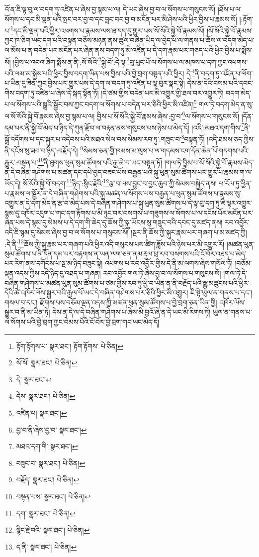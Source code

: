 འོ་ན་ཇི་ལྟ་བུ་ལ་བདག་ཏུ་འཛིན་པ་ཞེས་བྱ་སྙམ་པ་ལ། དེ་ཡང་ཞེས་བྱ་བ་ལ་སོགས་པ་གསུངས་སོ། །ཐོས་པ་ལ་སོགས་པ་དང་མི་ལྡན་པའི་སྤང་བར་བྱ་བ་དང་བླང་བར་བྱ་བ་མངོན་པར་མི་ཤེས་པའི་ཕྱིར་བྱིས་པ་རྣམས་སོ། །:རྟོག་པ་\footnote{རྟོག་རྟོགས་པ་  སྣར་ཐང་། རྟོག་རྟོགས་  པེ་ཅིན། }དང་མི་ལྡན་པའི་ཕྱིར་འཕགས་པ་རྣམས་ལས་ཐ་དད་དུ་གྱུར་པས་སོ་སོའི་སྐྱེ་བོ་རྣམས་སོ། །སོ་སོའི་སྐྱེ་བོ་རྣམས་ཀྱང་ཁ་ཅིག་ཡང་དག་པའི་བསྟན་བཅོས་མཉན་ནས་ཚུལ་བཞིན་ཡིད་ལ་བྱེད་པ་ལ་གནས་པ་ཆོས་ལ་བདག་མེད་པ་ལ་མོས་པ་ན་བདེན་པར་མངོན་པར་ཞེན་ནས་བདག་ཏུ་མི་འཛིན་པ་དེ་དག་རྣམ་པར་གཅད་པའི་ཕྱིར་བྱིས་པ་སྨོས་སོ། །བྱིས་པ་འབའ་ཞིག་སྨོས་ན་ནི་:སོ་སོའི་\footnote{སོ་སོ་  སྣར་ཐང་།  པེ་ཅིན། }སྐྱེ་བོ་:དེ་ལྟ་\footnote{དེ་  སྣར་ཐང་། }བུ་ཕུང་པོ་ལ་སོགས་པ་ལ་མཁས་པ་དག་ཀྱང་འཕགས་པའི་ལམ་མ་སྐྱེས་པའི་ཕྱིར་བྱིས་བདག་ཡིན་པས་བྱིས་པའི་བྱེ་བྲག་བསྟན་པའི་ཕྱིར། དེ་\footnote{དེས་  སྣར་ཐང་།  པེ་ཅིན། }ནི་བདག་ཏུ་འཛིན་པ་ལོག་པ་ཡིན་དུ་ཟིན་ཀྱང་བྱིས་པར་གྱུར་པས་དེ་དག་ལ་བདག་ཏུ་འཛིན་པ་ལྟ་བུར་སྣང་སྟེ། དེས་ན་དེའི་བསམ་པའི་དབང་གིས་བདག་ཏུ་འཛིན་པ་ཞེས་དེ་སྐད་སྟོན་ཏོ། །དེ་ཙམ་གྱིས་བདེན་པར་མི་འགྱུར་གྱི་ཐལ་བར་འགྱུར་ཏེ། བདག་མེད་པ་ལ་སོགས་པའི་སྒྲའི་སྦྱོར་བས་ཀྱང་བདག་ལ་སོགས་པ་བདེན་པར་ཅིའི་ཕྱིར་མི་འཛིན།\footnote{འཛིན་པ།  སྣར་ཐང་། } གལ་ཏེ་བདག་མེད་ན་སུ་ལ་སོ་སོའི་སྐྱེ་བོ་རྣམས་ཞེས་བྱ་སྙམ་པ་ལ། བྱིས་པ་སོ་སོའི་སྐྱེ་བོ་རྣམས་ཞེས་:བྱ་བ་\footnote{བྱ་བ་ནི་ཞེས་བྱ་བ་  སྣར་ཐང་། }ལ་སོགས་པ་གསུངས་སོ། །དོན་དམ་པར་ནི་སྐྱེ་བོ་མེད་པ་ཉིད་དེ་ཀུན་རྫོབ་ལ་བརྟན་ནས་གསུངས་པས་ཉེས་པ་མེད་དོ། །འདི་:མཐའ་དག་གིས་\footnote{མཐའ་དག་གི་  སྣར་ཐང་། }ནི་སྒྲོ་འདོགས་པ་དང་སྐུར་པ་འདེབས་པའི་མཐའ་སེལ་བས་སེམས་རབ་ཏུ་:གཟུང་བ་\footnote{བཟུང་བ་  སྣར་ཐང་།  པེ་ཅིན། }བསྟན་ཏོ། །འདི་ཐམས་ཅད་ཀྱིས་ནི་དངོས་སུ་ཟབ་པ་ཉིད་:བརྗོད་དེ། \footnote{བརྗོད་  སྣར་ཐང་།  པེ་ཅིན། }སེམས་ཅན་གྱི་ཁམས་མ་ལུས་པ་ལ་གདམས་ངག་དོན་ཆེན་པོ་གདགས་པའི་རྒྱུར་:བསྟན་པ་\footnote{བསྟན་པས་  སྣར་ཐང་།  པེ་ཅིན། }ནི་ཐུགས་ཕུན་སུམ་ཚོགས་པའི་རྒྱ་ཆེ་བ་ཡང་བསྟན་ཏོ། །གལ་ཏེ་བྱིས་པ་སོ་སོའི་སྐྱེ་བོ་རྣམས་མེད་ན་དེ་བཞིན་གཤེགས་པ་མཚན་དང་དཔེ་བྱད་བཟང་པོས་བརྒྱན་པའི་སྐུ་ཕུན་སུམ་ཚོགས་པར་གྱུར་པ་རྣམས་ག་ལ་ཡོད་དེ། སོ་སོའི་སྐྱེ་བོ་བདག་\footnote{དག་  སྣར་ཐང་།  པེ་ཅིན། }ཉིད་:སྙིང་རྗེའི་\footnote{སྙིང་རྗེ་བའི་  སྣར་ཐང་།  པེ་ཅིན། }རྩ་བ་ལས་བྱུང་བ་བྱང་ཆུབ་ཀྱི་སེམས་བསྐྱེད་ནས། ཕ་རོལ་ཏུ་ཕྱིན་པ་རྣམས་ལ་སྦྱོར་ན་དེ་བཞིན་གཤེགས་པའི་སྐུ་མཚན་ལ་སོགས་པས་བརྒྱན་པ་ཕུན་སུམ་ཚོགས་པ་རྣམས་སུ་འགྱུར་ན་དེ་དག་མེད་ན་རྩ་བ་མེད་པས་དེ་བཞིན་གཤེགས་པ་སྐུ་ཕུན་སུམ་ཚོགས་པ་དེ་ལྟ་བུ་དག་ཏུ་ཇི་ལྟར་འགྱུར་སྙམ་དུ་འཁོར་འདུག་པ་གང་དག་རྟོགས་པ་མི་ཉུང་བར་བསགས་པ་གཟུགས་ལ་སོགས་པ་ལ་དངོས་པོར་མངོན་པར་ཞེན་པས་དེ་སྙམ་དུ་སེམས་པ་དེ་དག་གི་ཆེད་དུ་ཆོས་ཀྱི་སྐུ་ཡོངས་སུ་གཟུང་བའི་དབང་དུ་མཛད་ནས། རབ་འབྱོར་འདི་ཇི་སྙམ་དུ་སེམས་ཞེས་བྱ་བ་ལ་སོགས་པ་གསུངས་སོ། །སྔར་ནི་ཆོས་ཀྱི་སྐུར་རྣམ་པར་གཞག་པ་མ་མཛད་ཀྱི། :དེ་ནི་\footnote{ད་ནི་  སྣར་ཐང་།  པེ་ཅིན། }ཆོས་ཀྱི་སྐུ་རྣམ་པར་གཞག་པའི་ཕྱིར་འདི་གསུངས་པས་ཚིག་ཟློས་པའི་ཉེས་པར་མི་འགྱུར་རོ། །མཚན་ཕུན་སུམ་ཚོགས་པ་ནི་དོན་དམ་པར་བརྟགས་ན་ཡན་ལག་ཅན་ནམ་རྡུལ་ཕྲ་རབ་བསགས་པའི་ངོ་བོར་འཐད་པ་མེད་པར་རིག་ནས་དགོངས་པ་སྔ་མ་ཉིད་བཟུང་སྟེ། འཕགས་པ་རབ་འབྱོར་གྱིས་དེ་ནི་མ་ལགས་ཞེས་གསོལ་ཏོ། །བཅོམ་ལྡན་འདས་ཀྱིས་འདི་ཉིད་དུ་འཐད་པ་གཞན། རབ་འབྱོར་གལ་ཏེ་ཞེས་བྱ་བ་ལ་སོགས་པ་གསུངས་སོ། །གལ་ཏེ་དེ་བཞིན་གཤེགས་པ་མཚན་ཕུན་སུམ་ཚོགས་པ་ཙམ་གྱིས་རབ་ཏུ་ཕྱེ་བ་ཡིན་ན་ནི་བརྗོད་པའི་རྒྱུ་མཚུངས་པའི་ཕྱིར་དེའི་ཚེ་འཁོར་ལོས་སྒྱུར་བའི་རྒྱལ་པོ་ཡང་དེ་བཞིན་གཤེགས་པར་ཅིའི་ཕྱིར་མི་འགྱུར། ཇི་སྟེ་ཡུལ་ན་གནས་པ་དང་། གསལ་བ་དང་། རྫོགས་པས་བཅོམ་ལྡན་འདས་ཀྱི་མཚན་ཕུན་སུམ་ཚོགས་པ་བྱེ་བྲག་ཅན་ཡིན་གྱི། འཁོར་ལོས་སྒྱུར་བ་ནི་མ་ཡིན་ཏེ། དེས་ན་དེ་ལ་དེ་བཞིན་གཤེགས་པ་ཞེས་མི་བྱའོ་ཞེ་ན་དེ་ཡང་མི་རིགས་ཏེ། ཡུལ་ན་གནས་པ་ལ་སོགས་པའི་བྱེ་བྲག་ཀྱང་བེམས་པོའི་ངོ་བོར་བྱེ་བྲག་གང་ཡང་མེད་དོ། 